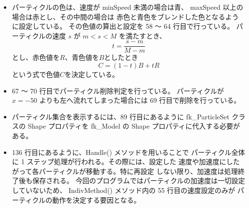 \begin{itemize}
 \item パーティクルの色は、速度が minSpeed 未満の場合は青、
	maxSpeed 以上の場合は赤とし、その中間の場合は
	赤色と青色をブレンドした色となるように設定している。
	その色値の算出と設定を 58 〜 64 行目で行っている。
	パーティクルの速度 \(s\) が \(m < s < M\) を満たすとき、
	\begin{equation}
		t = \frac{s - m}{M - m}
	\end{equation}
	とし、赤色値を\(R\)、青色値を\(B\)としたとき
	\begin{equation}
		 C = (1-t)B + tR
	\end{equation}
	という式で色値\(C\)を決定している。

 \item 67 〜 70 行目でパーティクル削除判定を行っている。
	パーティクルが \(x = -50\) よりも左へ流れてしまった場合には
	69 行目で削除を行っている。

 \item パーティクル集合を表示するには、89 行目にあるように
	fk\_ParticleSet クラスの Shape プロパティを
	fk\_Model の Shape プロパティに代入する必要がある。

 \item 136 行目にあるように、Handle() メソッドを用いることで
	パーティクル全体に 1 ステップ処理が行われる。その際には、設定した
	速度や加速度にしたがって各パーティクルが移動する。特に再設定
	しない限り、加速度は処理終了後も保存される。
	今回のプログラムではパーティクルの加速度は一切設定していないため、
	IndivMethod() メソッド内の 55 行目の速度設定のみが
	パーティクルの動作を決定する要因となる。

\end{itemize}

